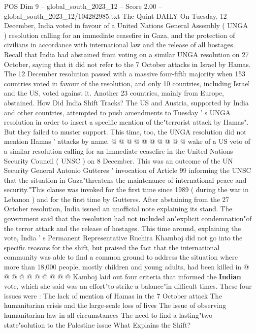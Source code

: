 \begin{textsample}{POS Dim 9 – global\_south\_2023\_12 – Score 2.00 – global\_south\_2023\_12/104282985.txt}  \label{ex:f9_pos_138}
The Quint DAILY On Tuesday, 12 December, India voted in favour of a United Nations General Assembly ( UNGA ) resolution calling for an immediate ceasefire in Gaza, and the protection of civilians in accordance with international law and the release of all hostages.
Recall that India had abstained from voting on a similar UNGA resolution on 27 October, saying that it did not refer to the 7 October attacks in Israel by Hamas.
The 12 December resolution passed with a massive four-fifth majority when 153 countries voted in favour of the resolution, and only 10 countries, including Israel and the US, voted against it.
Another 23 countries, mainly from Europe, abstained.
How Did India Shift Tracks?
The US and Austria, supported by India and other countries, attempted to push amendments to Tuesday ' s UNGA resolution in order to insert a specific mention of the"terrorist attack by Hamas".
But they failed to muster support.
This time, too, the UNGA resolution did not mention Hamas ' attacks by name. @ @ @ @ @ @ @ @ @ @ wake of a US veto of a similar resolution calling for an immediate ceasefire in the United Nations Security Council ( UNSC ) on 8 December.
This was an outcome of the UN Security General Antonio Gutteres ' invocation of Article 99 informing the UNSC that the situation in Gaza"threatens the maintenance of international peace and security."This clause was invoked for the first time since 1989 ( during the war in Lebanon ) and for the first time by Gutteres.
After abstaining from the 27 October resolution, India issued an unofficial note explaining its stand.
The government said that the resolution had not included an"explicit condemnation"of the terror attack and the release of hostages.
This time around, explaining the vote, India ' s Permanent Representative Ruchira Khamboj did not go into the specific reasons for the shift, but praised the fact that the international community was able to find a common ground to address the situation where more than 18,000 people, mostly children and young adults, had been killed in @ @ @ @ @ @ @ @ @ @ Kamboj laid out four criteria that informed the \textbf{Indian} vote, which she said was an effort"to strike a balance"in difficult times.
These four issues were : The lack of mention of Hamas in the 7 October attack The humanitarian crisis and the large-scale loss of lives The issue of observing humanitarian law in all circumstances The need to find a lasting"two-state"solution to the Palestine issue What Explains the Shift?

\end{textsample}
